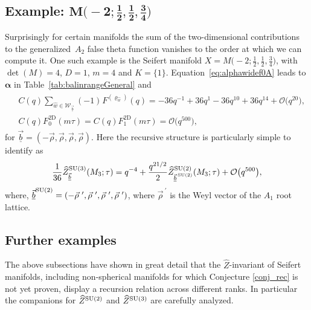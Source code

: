 \documentclass[10pt,a4paper]{amsart}
\def\bal{\boldsymbol{\alpha}}
\theoremstyle{definition}
\numberwithin{equation}{section}
\begin{document}
\subsection[Example: $M(-2;1/2,1/2,3/4)]{Example: $\boldsymbol{M\bigl(-2;\frac{1}{2},\frac{1}{2},\frac{3}{4}\bigr)}$}

Surprisingly for certain manifolds the sum of the two-dimensional contributions to the generalized~$A_2$ false theta function vanishes to the order at which we can compute it. One such example is the Seifert manifold $X=M\bigl(-2; \frac{1}{2},\frac{1}{2},\frac{3}{4} \bigr)$, with $\det(M)=4$, $D=1$, $m=4$ and $K=\{1\}$. Equation~\eqref{eq:alphawidef0A} leads to $\bal$ in Table~\ref{tab:balinrangeGeneral} and
\begin{gather*}
\begin{split}
& C(q)\sum_{\hat{w}\in\mathcal W_{\vec{\underline{b}}}} ( -1 )^{}F^{ ( \varrho_{\hat{w}} )} ( q )={-}36 q^{-1} + 36q^{1} {-}36 q^{10} + 36 q^{14} + \mathcal{O} \bigl(q^{20} \bigr),\\
& C(q)F_{0}^{\text{2D}} (m\tau )= C(q)F_{1}^{\text{2D}} (m\tau ) = \mathcal{O} \bigl( q^{500} \bigr),
\end{split}
\end{gather*}
for $\vec{\underline{b}}=\left(-\vec\rho,\vec\rho,\vec\rho,\vec\rho\right)$. Here the recursive structure is particularly simple to identify as
\begin{equation*}
\frac{1}{36}\widehat{Z}^{{\rm SU}(3)}_{\vec{\underline{b}}}(M_3;\tau)=q^{-4}+\frac{q^{21/2}}{2}\widehat{Z}^{{\rm SU}(2)}_{\vec{\underline{b}}^{\, {\rm SU}(2)}}(M_3;\tau) + \mathcal{O}\bigl(q^{500}\bigr),
\end{equation*}
where, $\vec{\underline{b}}^{ {\rm SU}(2)}=\left(-\vec\rho^{\ \prime},\vec\rho^{\ \prime},\vec\rho^{\ \prime},\vec\rho^{\ \prime}\right)$, where $\vec{\rho}^{\ \prime}$ is the Weyl vector of the $A_1$ root lattice.

\subsection{Further examples}

The above subsections have shown in great detail that the $\widehat{Z}$-invariant of Seifert manifolds, including non-spherical manifolds for which Conjecture \ref{conj_rec} is not yet proven, display a recursion relation across different ranks. In particular the companions for $\widehat Z^{{\rm SU}(2)}$ and $\widehat Z^{{\rm SU}(3)}$ are carefully analyzed.
\end{document}
